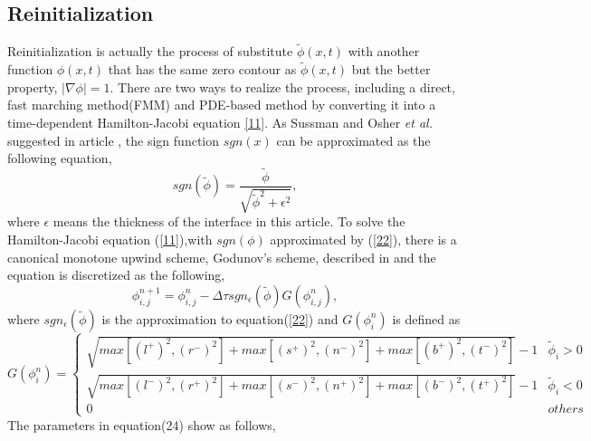 \subsection{Reinitialization}
Reinitialization is actually the process of substitute $\tilde{\phi}(x,t)$ with another function $\phi(x,t)$ that has the same zero contour as $\tilde{\phi}(x,t)$ but the better property, $\left|\nabla\phi\right|=1$\cite{peng1999pde}. There are two ways to realize the process, including a direct, fast marching method(FMM)\cite{sethian1999level} and PDE-based method \cite{Sussman1994A} by converting it into a time-dependent Hamilton-Jacobi equation \ref{11}. As Sussman and Osher \textit{et al.} suggested in article \cite{Sussman1994A}, the sign function $sgn(x)$ can be approximated as the following equation,
\begin{equation}\label{22}
sgn(\tilde{\phi})=\frac{\tilde{\phi}}{\sqrt{{\tilde{\phi}}^2+\epsilon^2}},
\end{equation}
where $\epsilon$ means the thickness of the interface in this article. To solve the Hamilton-Jacobi equation (\ref{11}),with $sgn(\phi)$ approximated by (\ref{22}), there is a canonical monotone upwind scheme, Godunov's scheme, described in \cite{osher2006level,osher1991high} and the equation is discretized as the following,
\begin{equation}\label{23}
\phi^{n+1}_{i,j}=\phi^{n}_{i,j}-\Delta{\tau}sgn_\epsilon(\tilde{\phi})G(\phi^{n}_{i,j}),
\end{equation}
where $sgn_{\epsilon}(\tilde{\phi})$ is the approximation to equation(\ref{22}) and $G(\phi^{n}_{i})$ is defined as
\begin{equation}\label{24}
G(\phi^{n}_{i})=
\left\{
\begin{array}{ll}
\sqrt{max[(l^{+})^2,(r^{-})^2]+max[(s^{+})^2,(n^{-})^2]+max[(b^{+})^2,(t^{-})^2]}-1&{\tilde{\phi}_{i}>0} \\
\sqrt{max[(l^{-})^2,(r^{+})^2]+max[(s^{-})^2,(n^{+})^2]+max[(b^{-})^2,(t^{+})^2]}-1&{\tilde{\phi}_{i}<0}\\
0 & others 
\end{array}\right.
\end{equation}
The parameters in equation(24) show as follows,
